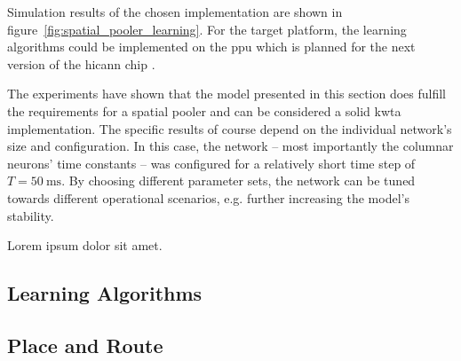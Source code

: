 \begin{figure*}
	\begin{center}
		
	\end{center}
	\caption{Dependency of output and input overlap for a trained spatial pooler. Results of five independent simulation runs are shown as well as reference data from a custom software implementation.}
	\label{fig:spatial_pooler_learning}
\end{figure*}

Simulation results of the chosen implementation are shown in figure~\ref{fig:spatial_pooler_learning}. For the target platform, the learning algorithms could be implemented on the \gls{ppu} which is planned for the next version of the \gls{hicann} chip \citep{friedmann2013phd}.

The experiments have shown that the model presented in this section does fulfill the requirements for a spatial pooler and can be considered a solid \gls{kwta} implementation. The specific results of course depend on the individual network's size and configuration. In this case, the network -- most importantly the columnar neurons' time constants -- was configured for a relatively short time step of $T = \SI{50}{\milli\second}$. By choosing different parameter sets, the network can be tuned towards different operational scenarios, e.g. further increasing the model's stability.


Lorem ipsum dolor sit amet.

\begin{figure*}
	\begin{center}
		
	\end{center}
	\caption{A \gls{lif} neuron based temporal memory implementation correctly predicting different patterns. Predicted cells are marked blue, active cells in purple. The network spans 128 columns with each of their eight \gls{htm} cells collecting distal stimuli via two dendritic segments. Connectivity for the distal inputs was configured externally. The model was presented three disjunct sequences of size three. The individual patterns were separated by a random input \gls{sdr}.}
	\label{fig:static_temporal_memory_live}
\end{figure*}

\subsection{Learning Algorithms}

\subsection{Place and Route}
